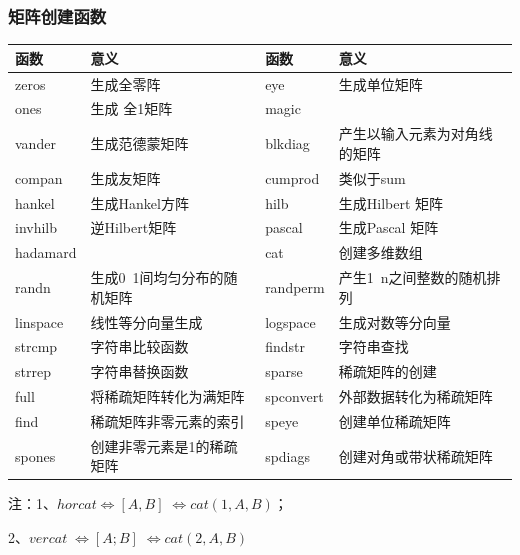         \subsubsection{矩阵创建函数}
            \par
            \begin{table}[H]
            \begin{tabularx}{\textwidth}{lXlX}%
            \toprule
            函数 & 意义&函数 & 意义\\
            \midrule
            zeros &生成全零阵&eye  &生成单位矩阵 \\
             ones&生成 全1矩阵 &magic  &{}\\
            vander  &生成范德蒙矩阵&blkdiag& 产生以输入元素为对角线的矩阵\\
            compan& 生成友矩阵&cumprod &类似于sum\\
            hankel  &生成Hankel方阵&hilb  &生成Hilbert 矩阵\\
            invhilb&  逆Hilbert矩阵& pascal  &生成Pascal 矩阵\\
            hadamard  &{}&cat &创建多维数组\\
            randn &生成0~1间均匀分布的随机矩阵 &randperm& 产生1~n之间整数的随机排列\\
            linspace  &线性等分向量生成 &logspace & 生成对数等分向量\\
            strcmp  &字符串比较函数&findstr  &字符串查找\\
            strrep  &字符串替换函数 &sparse  &稀疏矩阵的创建\\
            full  &将稀疏矩阵转化为满矩阵& spconvert&  外部数据转化为稀疏矩阵\\
            find  &稀疏矩阵非零元素的索引& speye &创建单位稀疏矩阵\\
            spones  &创建非零元素是1的稀疏矩阵 &spdiags &创建对角或带状稀疏矩阵\\
            \bottomrule
            \end{tabularx}
            \end{table}
            \noindent
            注：1、$horcat \Leftrightarrow [A, B] \Leftrightarrow cat(1, A, B)$；
            \par
            2、$vercat \Leftrightarrow [A; B] \Leftrightarrow cat(2, A, B)$
